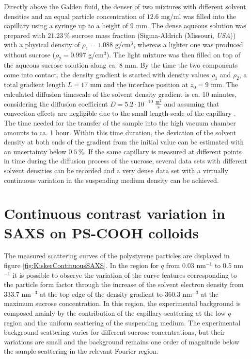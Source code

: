 Directly above the Galden fluid, the denser of two mixtures with different solvent densities and an equal particle concentration of \(12.6 \mbox{ mg/ml} \) was filled into the capillary using a syringe up to a height of  \(9\) mm. The dense aqueous solution was prepared with \( 21.23\,\%\) sucrose mass fraction (Sigma-Aldrich (Missouri, \emph{USA})) with a physical density of \(\rho_1=1.088 \) g/cm\(^3\), whereas a lighter one was produced without sucrose (\(\rho_2=0.997 \) g/cm\(^3\)). The light mixture was then filled on top of the aqueous sucrose solution along ca. \(8\) mm. By the time the two components come into contact, the density gradient is started with density values \(\rho_1\) and \(\rho_2\), a total gradient length \(L=17\) mm and the interface position at \(z_0=9\) mm. The calculated diffusion timescale of the solvent density gradient is ca. 10 minutes, considering the diffusion coefficient \(D=5.2 \cdot 10^{-10} \;\frac{\mbox{m}^2}{\mbox{s}}\) \citet{uedaira_sugar-water_1985,ribeiro_binary_2006} and assuming that convection effects are negligible due to the small length-scale of the capillary \citet{berberan-santos_barometric_1997}. The time needed for the transfer of the sample into the high vacuum chamber amounts to ca. 1 hour. Within this time duration, the deviation of the solvent density at both ends of the gradient from the initial value can be estimated with an uncertainty below \(0.5\,\%\). If the same capillary is measured at different points in time during the diffusion process of the sucrose, several data sets with different solvent densities can be recorded and a very dense data set with a virtually continuous variation in the suspending medium density can be achieved.

\section{Continuous contrast variation in SAXS on PS-COOH colloids}
\label{sec:KiskerResultsEvaluation}
The measured scattering curves of the polystyrene particles are displayed in figure \ref{fig:KiskerContinuousSAXS}. In the region for \(q\) from 0.03 nm\(^{-1}\) to 0.5 nm\(^{-1}\) it is possible to observe the variation of the curve features corresponding to the particle form factor through the increase of the solvent electron density from 333.7 nm\(^{-3}\) at the top edge of the density gradient to 360.3 nm\(^{-3}\) at the maximum sucrose concentration. In this region, the experimental background is composed mainly by the contribution of the capillary scattering at the low $q$-region and the uniform scattering of the suspending medium. The experimental background scattering varies for different sucrose concentrations, but their variations are small and the background remains one order of magnitude below the sample scattering in the relevant Fourier region.

